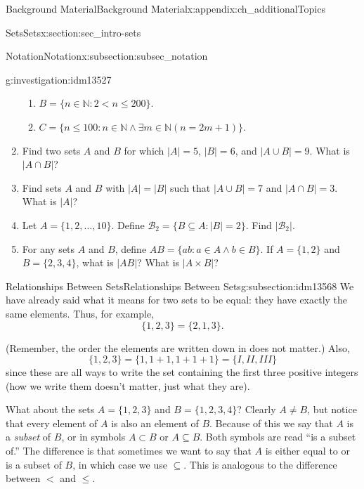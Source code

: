 \documentclass[oneside,10pt,]{book}
\numberwithin{equation}{chapter}
\def\N{\mathbb N}
\def\st{:}
\newcommand{\lt}{<}
\begin{document}
\begin{appendixptx}{Background Material}{}{Background Material}{}{}{x:appendix:ch_additionalTopics}
\begin{sectionptx}{Sets}{}{Sets}{}{}{x:section:sec_intro-sets}
\begin{subsectionptx}{Notation}{}{Notation}{}{}{x:subsection:subsec_notation}
\begin{investigation}{}{g:investigation:idm13527}
\begin{enumerate}
\begin{enumerate}
\item{}\(B = \{n \in \N \st 2 \lt  n \le 200\}\).%
\item{}\(C = \{n \le 100 \st n \in \N \wedge \exists m \in \N (n = 2m+1)\}\).%
\end{enumerate}
%
\item{}Find two sets \(A\) and \(B\) for which \(|A| = 5\), \(|B| = 6\), and \(|A\cup B| = 9\). What is \(|A \cap B|\)?%
\item{}Find sets \(A\) and \(B\) with \(|A| = |B|\) such that \(|A\cup B| = 7\) and \(|A \cap B| = 3\). What is \(|A|\)?%
\item{}Let \(A = \{1,2,\ldots, 10\}\). Define \(\mathcal{B}_2 = \{B \subseteq A \st |B| = 2\}\). Find \(|\mathcal{B}_2|\).%
\item{}For any sets \(A\) and \(B\), define \(AB = \{ab \st a\in A \wedge b \in B\}\). If \(A = \{1,2\}\) and \(B = \{2,3,4\}\), what is \(|AB|\)? What is \(|A \times B|\)?%
\end{enumerate}
%
\end{investigation}
\end{subsectionptx}
%
%
\typeout{************************************************}
\typeout{************************************************}
%
\begin{subsectionptx}{Relationships Between Sets}{}{Relationships Between Sets}{}{}{g:subsection:idm13568}
We have already said what it means for two sets to be equal: they have exactly the same elements. Thus, for example,%
\begin{equation*}
\{1, 2, 3\} = \{2, 1, 3\}.
\end{equation*}
%
\par
(Remember, the order the elements are written down in does not matter.) Also,%
\begin{equation*}
\{1, 2, 3\} = \{1, 1+1, 1+1+1\} = \{I, II, III\}
\end{equation*}
since these are all ways to write the set containing the first three positive integers (how we write them doesn't matter, just what they are).%
\par
What about the sets \(A = \{1, 2, 3\}\) and \(B = \{1, 2, 3, 4\}\)? Clearly \(A \ne B\), but notice that every element of \(A\) is also an element of \(B\). Because of this we say that \(A\) is a \emph{subset}  of \(B\), or in symbols \(A \subset B\) or \(A \subseteq B\). Both symbols are read ``is a subset of.'' The difference is that sometimes we want to say that \(A\) is either equal to or is a subset of \(B\), in which case we use \(\subseteq\). This is analogous to the difference between \(\lt\) and \(\le\).%

\end{subsectionptx}
\end{sectionptx}
\end{appendixptx}
\end{document}
